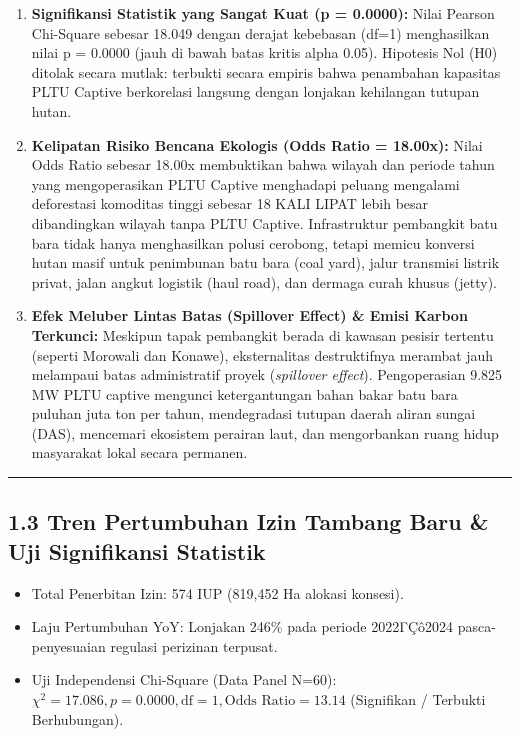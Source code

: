 \documentclass[
]{article}
\providecommand{\tightlist}{%
  \setlength{\itemsep}{0pt}\setlength{\parskip}{0pt}}
\begin{document}
\begin{enumerate}
\def\labelenumi{\arabic{enumi}.}
\tightlist
\item
  \textbf{Signifikansi Statistik yang Sangat Kuat (p = 0.0000):} Nilai
  Pearson Chi-Square sebesar 18.049 dengan derajat kebebasan (df=1)
  menghasilkan nilai p = 0.0000 (jauh di bawah batas kritis alpha 0.05).
  Hipotesis Nol (H0) ditolak secara mutlak: terbukti secara empiris
  bahwa penambahan kapasitas PLTU Captive berkorelasi langsung dengan
  lonjakan kehilangan tutupan hutan.
\item
  \textbf{Kelipatan Risiko Bencana Ekologis (Odds Ratio = 18.00x):}
  Nilai Odds Ratio sebesar 18.00x membuktikan bahwa wilayah dan periode
  tahun yang mengoperasikan PLTU Captive menghadapi peluang mengalami
  deforestasi komoditas tinggi sebesar 18 KALI LIPAT lebih besar
  dibandingkan wilayah tanpa PLTU Captive. Infrastruktur pembangkit batu
  bara tidak hanya menghasilkan polusi cerobong, tetapi memicu konversi
  hutan masif untuk penimbunan batu bara (coal yard), jalur transmisi
  listrik privat, jalan angkut logistik (haul road), dan dermaga curah
  khusus (jetty).
\item
  \textbf{Efek Meluber Lintas Batas (Spillover Effect) \& Emisi Karbon
  Terkunci:} Meskipun tapak pembangkit berada di kawasan pesisir
  tertentu (seperti Morowali dan Konawe), eksternalitas destruktifnya
  merambat jauh melampaui batas administratif proyek (\emph{spillover
  effect}). Pengoperasian 9.825 MW PLTU captive mengunci ketergantungan
  bahan bakar batu bara puluhan juta ton per tahun, mendegradasi tutupan
  daerah aliran sungai (DAS), mencemari ekosistem perairan laut, dan
  mengorbankan ruang hidup masyarakat lokal secara permanen.
\end{enumerate}

\begin{center}\rule{0.5\linewidth}{0.5pt}\end{center}

\subsection{1.3 Tren Pertumbuhan Izin Tambang Baru \& Uji Signifikansi
Statistik}\label{tren-pertumbuhan-izin-tambang-baru-uji-signifikansi-statistik}

\begin{itemize}
\tightlist
\item
  Total Penerbitan Izin: 574 IUP (819,452 Ha alokasi konsesi).
\item
  Laju Pertumbuhan YoY: Lonjakan 246\% pada periode 2022ΓÇô2024
  pasca-penyesuaian regulasi perizinan terpusat.
\item
  Uji Independensi Chi-Square (Data Panel N=60):
  \(\chi^2 = 17.086, p = 0.0000, \text{df} = 1, \text{Odds Ratio} = 13.14\)
  (Signifikan / Terbukti Berhubungan).
\end{itemize}
\end{document}
